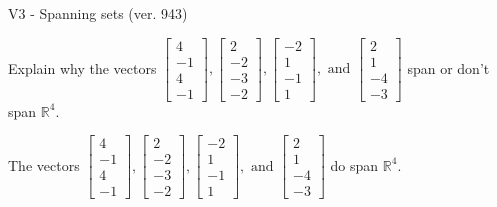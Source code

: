 \begin{exercise}
  \begin{exerciseTitle}V3 - Spanning sets (ver. 943)\end{exerciseTitle}
  \begin{exerciseStatement}
    Explain why the vectors \(\left[\begin{array}{r}
4 \\
-1 \\
4 \\
-1
\end{array}\right] , \left[\begin{array}{r}
2 \\
-2 \\
-3 \\
-2
\end{array}\right] , \left[\begin{array}{r}
-2 \\
1 \\
-1 \\
1
\end{array}\right] , \text{ and } \left[\begin{array}{r}
2 \\
1 \\
-4 \\
-3
\end{array}\right]\) span or don't span \(\mathbb{R}^4\). 
	


  \end{exerciseStatement}
  \begin{exerciseAnswer}
   The vectors \(\left[\begin{array}{r}
4 \\
-1 \\
4 \\
-1
\end{array}\right] , \left[\begin{array}{r}
2 \\
-2 \\
-3 \\
-2
\end{array}\right] , \left[\begin{array}{r}
-2 \\
1 \\
-1 \\
1
\end{array}\right] , \text{ and } \left[\begin{array}{r}
2 \\
1 \\
-4 \\
-3
\end{array}\right]\) 
  	 do  
	span \(\mathbb{R}^4\).
  


  \end{exerciseAnswer}
\end{exercise}